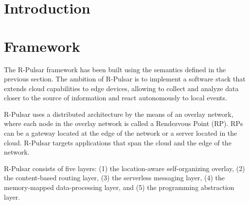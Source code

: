 \section{Introduction}

\section{Framework}

The R-Pulsar framework has been built using the semantics defined in the previous section. The ambition of R-Pulsar is to implement a software stack that extends cloud capabilities to edge devices, allowing to collect and analyze data closer to the source of information and react autonomously to local events.

R-Pulsar uses a distributed architecture by the means of an overlay network, where each node in the overlay network is called a Rendezvous Point (RP). RPs can be a gateway located at the edge of the network or a server located in the cloud. R-Pulsar targets applications that span the cloud and the edge of the network.

R-Pulsar consists of five layers: (1) the location-aware self-organizing overlay, (2) the content-based routing layer, (3) the serverless messaging layer, (4) the memory-mapped data-processing layer, and (5) the programming abstraction layer.


